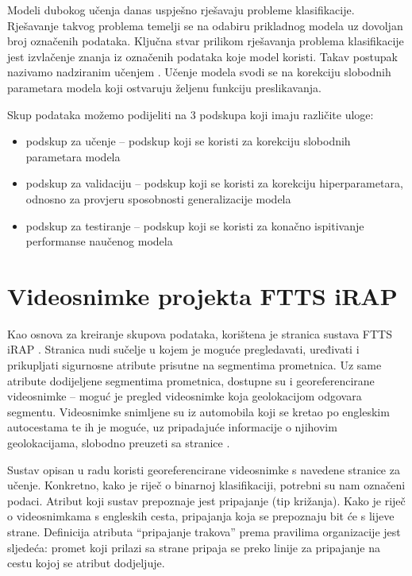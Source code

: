 \documentclass[times, utf8, diplomski, numeric]{fer}
\begin{document}
Modeli dubokog učenja danas uspješno rješavaju probleme klasifikacije. Rješavanje takvog problema temelji se na odabiru prikladnog modela uz dovoljan broj označenih podataka. 
Ključna stvar prilikom rješavanja problema klasifikacije jest izvlačenje znanja iz označenih podataka koje model koristi. Takav postupak nazivamo nadziranim učenjem \citep{book:deeplearningbook}. 
Učenje modela svodi se na korekciju slobodnih parametara modela koji ostvaruju željenu funkciju preslikavanja.

Skup podataka možemo podijeliti na 3 podskupa koji imaju različite uloge:
\begin{itemize}
 \item podskup za učenje -- podskup koji se koristi za korekciju slobodnih parametara modela
 \item podskup za validaciju -- podskup koji se koristi za korekciju hiperparametara, odnosno za provjeru sposobnosti generalizacije modela
 \item podskup za testiranje -- podskup koji se koristi za konačno ispitivanje performanse naučenog modela
\end{itemize}


\section{Videosnimke projekta FTTS iRAP}

Kao osnova za kreiranje skupova podataka, korištena je stranica sustava FTTS iRAP \citep{url:ftts_irap}. 
Stranica nudi sučelje u kojem je moguće pregledavati, uređivati i prikupljati sigurnosne atribute prisutne na segmentima prometnica.
Uz same atribute dodijeljene segmentima prometnica, dostupne su i georeferencirane videosnimke -- moguć je pregled videosnimke koja geolokacijom odgovara segmentu.
Videosnimke snimljene su iz automobila koji se kretao po engleskim autocestama te ih je moguće, uz pripadajuće informacije o njihovim geolokacijama, slobodno preuzeti sa stranice \citep{url:ftts_irap}.

Sustav opisan u radu koristi georeferencirane videosnimke s navedene stranice za učenje. Konkretno, kako je riječ o binarnoj klasifikaciji, potrebni su nam označeni podaci. 
Atribut koji sustav prepoznaje jest pripajanje  (tip križanja). Kako je riječ o videosnimkama s engleskih cesta, pripajanja koja se prepoznaju bit će s lijeve strane.
Definicija atributa ``pripajanje trakova'' prema pravilima organizacije \citep{man:ftts_irap_coding_manual} jest sljedeća: promet koji prilazi sa strane pripaja se preko linije za pripajanje na cestu kojoj se atribut dodjeljuje.
\end{document}

